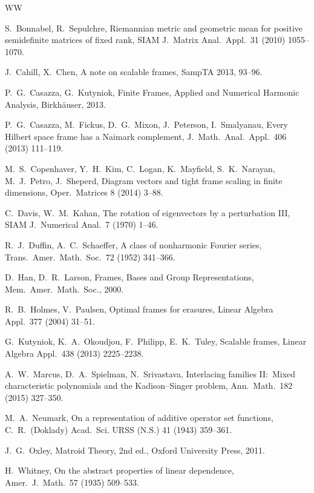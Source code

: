\documentclass[12pt]{article}
\theoremstyle{plain}
\theoremstyle{definition}
\theoremstyle{remark}
\begin{document}
\begin{thebibliography}{WW}

S.\ Bonnabel, R.\ Sepulchre,
Riemannian metric and geometric mean for positive semidefinite matrices of fixed rank,
SIAM J.\ Matrix Anal.\ Appl.\ 31 (2010) 1055--1070.

J.\ Cahill, X.\ Chen,
A note on scalable frames,
SampTA 2013, 93--96.

P.\ G.\ Casazza, G.\ Kutyniok,
Finite Frames,
Applied and Numerical Harmonic Analysis,
Birkh\"{a}user, 2013.

P.\ G.\ Casazza, M.\ Fickus, D.\ G.\ Mixon, J.\ Peterson, I.\ Smalyanau,
Every Hilbert space frame has a Naimark complement,
J.\ Math.\ Anal.\ Appl.\ 406 (2013) 111--119.

M.\ S.\ Copenhaver, Y.\ H.\ Kim, C.\ Logan, K.\ Mayfield, S.\ K.\ Narayan, M.\ J.\ Petro, J.\ Sheperd,
Diagram vectors and tight frame scaling in finite dimensions,
Oper.\ Matrices 8 (2014) 3--88.

C.\ Davis, W.\ M.\ Kahan,
The rotation of eigenvectors by a perturbation III,
SIAM J.\ Numerical Anal.\ 7 (1970) 1--46.

R.\ J.\ Duffin, A.\ C.\ Schaeffer,
A class of nonharmonic Fourier series,
Trans.\ Amer.\ Math.\ Soc.\ 72 (1952) 341--366.

D.\ Han, D.\ R.\ Larson,
Frames, Bases and Group Representations,
Mem.\ Amer.\ Math.\ Soc., 2000.

R.\ B.\ Holmes, V.\ Paulsen,
Optimal frames for erasures,
Linear Algebra Appl.\ 377 (2004) 31--51.

G.\ Kutyniok, K.\ A.\ Okoudjou, F.\ Philipp, E.\ K.\ Tuley,
Scalable frames,
Linear Algebra Appl.\ 438 (2013) 2225--2238.

A.\ W.\ Marcus, D.\ A.\ Spielman, N.\ Srivastava,
Interlacing families II:\ Mixed characteristic polynomials and the Kadison--Singer problem,
Ann.\ Math.\ 182 (2015) 327--350.

M.\ A.\ Neumark, 
On a representation of additive operator set functions,
C.\ R.\ (Doklady) Acad.\ Sci. URSS (N.S.) 41 (1943) 359--361.

J.\ G.\ Oxley,
Matroid Theory, 2nd ed.,
Oxford University Press, 2011.

H.\ Whitney,
On the abstract properties of linear dependence,
Amer.\ J.\ Math.\ 57 (1935) 509--533.

\end{thebibliography}
\end{document}
